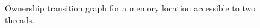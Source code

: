 \begin{figure}[!]
  \begin{center}
    {}
  \end{center}
  \vspace{-4mm}
  \caption{Ownership transition graph for a memory location accessible to two
    threads.}
  \label{fig:ownership-graph}
\end{figure}

